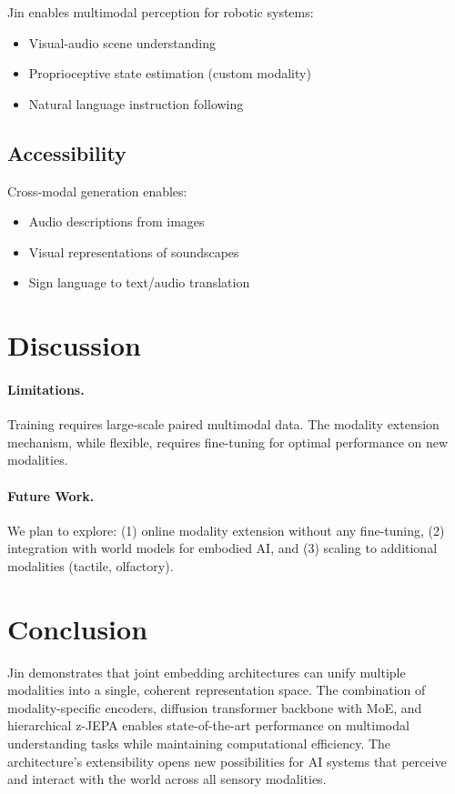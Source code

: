 \documentclass[11pt,twocolumn]{article}
\begin{document}
Jin enables multimodal perception for robotic systems:
\begin{itemize}
    \item Visual-audio scene understanding
    \item Proprioceptive state estimation (custom modality)
    \item Natural language instruction following
\end{itemize}

\subsection{Accessibility}

Cross-modal generation enables:
\begin{itemize}
    \item Audio descriptions from images
    \item Visual representations of soundscapes
    \item Sign language to text/audio translation
\end{itemize}

\section{Discussion}

\paragraph{Limitations.} Training requires large-scale paired multimodal data. The modality extension mechanism, while flexible, requires fine-tuning for optimal performance on new modalities.

\paragraph{Future Work.} We plan to explore: (1) online modality extension without any fine-tuning, (2) integration with world models for embodied AI, and (3) scaling to additional modalities (tactile, olfactory).

\section{Conclusion}

Jin demonstrates that joint embedding architectures can unify multiple modalities into a single, coherent representation space. The combination of modality-specific encoders, diffusion transformer backbone with MoE, and hierarchical z-JEPA enables state-of-the-art performance on multimodal understanding tasks while maintaining computational efficiency. The architecture's extensibility opens new possibilities for AI systems that perceive and interact with the world across all sensory modalities.
\end{document}
